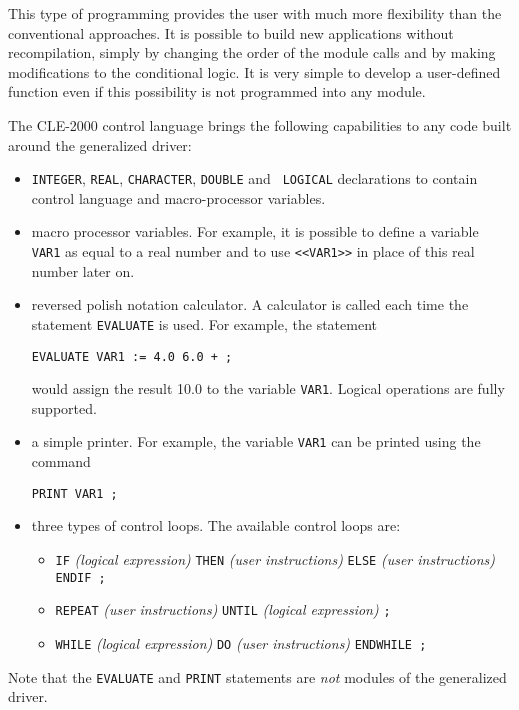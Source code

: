  This type of programming provides the user with much more flexibility  than
the conventional approaches. It is possible to build new applications without
recompilation, simply by changing the order of the module calls and by making
modifications to the conditional logic. It is very simple to develop a
user-defined function even if this possibility is not programmed into any
module.


The CLE-2000 control language brings the following capabilities to any code built around the generalized driver:

\begin{itemize}
\item {\tt INTEGER}, {\tt REAL}, {\tt CHARACTER}, {\tt DOUBLE} and  {\tt
LOGICAL} declarations to contain control language and macro-processor variables.

\item macro processor variables. For example, it is possible to define a variable {\tt VAR1} as equal to a real number and to use {\tt <<VAR1>>} in place of this real number later on.

\item reversed polish notation calculator. A calculator is called each time the statement {\tt EVALUATE} is used. For example, the statement
  \begin{verbatim}
EVALUATE VAR1 := 4.0 6.0 + ;
  \end{verbatim}
would assign the result 10.0 to the variable {\tt VAR1}. Logical operations are fully supported.

\item a simple printer. For example, the variable {\tt VAR1} can be printed using the command
  \begin{verbatim}
PRINT VAR1 ;
  \end{verbatim}

\item three types of control loops. The available control loops are:

\begin{itemize}
\item {\tt IF} {\sl (logical expression)} {\tt THEN} {\sl (user instructions)} {\tt ELSE} {\sl (user instructions)} {\tt ENDIF ;}
\item {\tt REPEAT} {\sl (user instructions)} {\tt UNTIL} {\sl (logical expression)} {\tt ;}
\item {\tt WHILE} {\sl (logical expression)} {\tt DO} {\sl (user instructions)} {\tt ENDWHILE ;}
\end{itemize}

\end{itemize}

\vskip 0.2cm

Note that the {\tt EVALUATE} and {\tt PRINT} statements are {\sl not} modules of the generalized driver.

